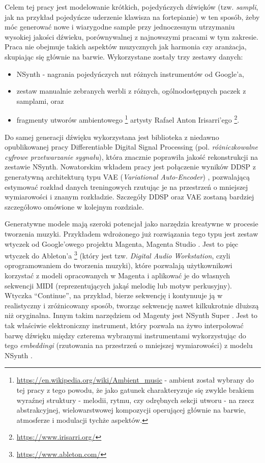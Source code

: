 \documentclass[magisterska]{pracamgr}
\begin{document}
Celem tej pracy jest modelowanie krótkich, pojedyńczych dźwięków (tzw. \textit{sampli}, jak na przykład pojedyńcze uderzenie klawisza na fortepianie) w ten sposób, żeby móc generować nowe i wiarygodne sample przy jednoczesnym utrzymaniu wysokiej jakości dźwieku, porównywalnej z najnowszymi pracami w tym zakresie. Praca nie obejmuje takich aspektów muzycznych jak harmonia czy aranżacja, skupiając się głównie na barwie. Wykorzystane zostały trzy zestawy danych:
\begin{itemize}
    \setlength\itemsep{0em}
    \item NSynth \cite{nsynth2017} - nagrania pojedyńczych nut różnych instrumentów od Google'a,
    \item zestaw manualnie zebranych werbli z różnych, ogólnodostępnych paczek z samplami, oraz
    \item fragmenty utworów ambientowego \footnote{\url{https://en.wikipedia.org/wiki/Ambient_music} - ambient został wybrany do tej pracy z tego powodu, że jako gatunek charakteryzuje się zwykle brakiem wyraźnej struktury - melodii, rytmu, czy odrębnych sekcji utworu - na rzecz abstrakcyjnej, wielowarstwowej kompozycji operującej głównie na barwie, atmosferze i modulacji tychże aspektów.} artysty Rafael Anton Irisarri'ego \footnote{\url{https://www.irisarri.org/}}.
\end{itemize}

Do samej generacji dźwięku wykorzystana jest biblioteka z niedawno opublikowanej pracy Differentiable Digital Signal Processing \cite{engel2020ddsp} (pol. \textit{różniczkowalne cyfrowe przetwarzanie sygnału}), która znacznie poprawiła jakość rekonstrukcji na zestawie NSynth. Nowatorskim wkładem pracy jest połączenie wyników DDSP z generatywną architekturą typu VAE (\textit{Variational Auto-Encoder}) \cite{kingma2014autoencoding}, pozwalającą estymować rozkład danych treningowych rzutując je na przestrzeń o mniejszej wymiarowości i znanym rozkładzie. Szczegóły DDSP oraz VAE zostaną bardziej szczegółowo omówione w kolejnym rozdziale.

Generatywne modele mają szeroki potencjał jako narzędzia kreatywne w procesie tworzenia muzyki. Przykładem wdrożonego już rozwiązania tego typu jest zestaw wtyczek od Google'owego projektu Magenta, Magenta Studio \cite{magentastudio}. Jest to pięc wtyczek do Ableton'a \footnote{\url{https://www.ableton.com/}} (który jest tzw. \textit{Digital Audio Workstation}, czyli oprogramowaniem do tworzenia muzyki), które pozwalają użytkownikowi korzystać z modeli opracowanych w Magenta i aplikować je do własnych sekwencji MIDI (reprezentujących jakąś melodię lub motyw perkusyjny). Wtyczka "`Continue"', na przykład, bierze sekwencję i kontynuuje ją w realistyczny i zróżnicowany sposób, tworząc sekwencję nawet kilkukrotnie dłuższą niż  oryginalna. Innym takim narzędziem od Magenty jest NSynth Super \cite{nsynthsuper}. Jest to tak właściwie elektroniczny instrument, który pozwala na żywo interpolować barwę dźwięku między czterema wybranymi instrumentami wykorzystując do tego \textit{embeddingi} (rzutowania na przestrzeń o mniejszej wymiarowości) z modelu NSynth \cite{nsynth2017}.
\end{document}
